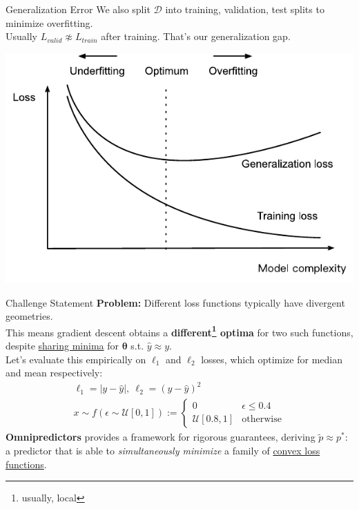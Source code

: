 \documentclass{beamer}
\begin{document}
\begin{frame}{Generalization Error}
	We also split $\mathcal{D}$ into training, validation, test splits to minimize overfitting. \pause \newline \\
	Usually $L_{valid} \not\approx L_{train}$ after training. That's our generalization gap.
	\begin{center}
		\includegraphics[width=.8\textwidth]{img/generalization}
	\end{center}
\end{frame}

\begin{frame}{Challenge Statement}
	\textbf{Problem:} Different loss functions typically have divergent geometries. \pause \newline \\

	This means gradient descent obtains a \textbf{different\footnote{usually, local} optima} for two such functions, despite \underline{sharing minima} for $\bm{\theta}$ s.t. $\hat{y} \approx y$. \pause \newline \\

	Let's evaluate this empirically on $\ell_1$ and $\ell_2$ losses, which optimize for median and mean respectively:
	\begin{gather}
		\ell_1 = |y-\hat{y}|,~\ell_2 = (y-\hat{y})^2 \\ 
		x \sim f(\epsilon \sim \mathcal{U}[0,1]) := \begin{cases}
			0 & \epsilon \leq 0.4 \\
			\mathcal{U}[0.8, 1] & \text{otherwise}
		\end{cases}
	\end{gather} \pause
	\textbf{Omnipredictors} provides a framework for rigorous guarantees, deriving $\tilde{p} \approx p^*$: a predictor that is able to \textit{simultaneously minimize} a family of \underline{convex loss functions}.
\end{frame}
\end{document}
